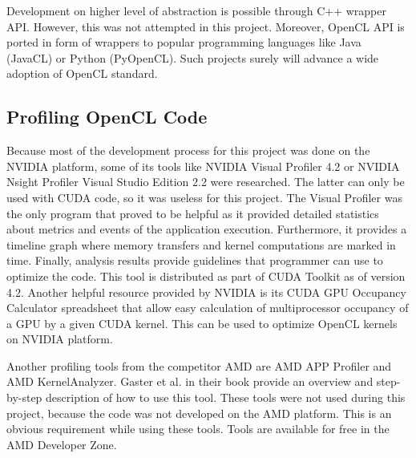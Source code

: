 Development on higher level of abstraction is possible through C++ wrapper API. However, this was not attempted in this project. Moreover, OpenCL API is ported in form of wrappers to popular programming languages like Java (JavaCL) or Python (PyOpenCL). Such projects surely will advance a wide adoption of OpenCL standard. 

\subsection{Profiling OpenCL Code}
Because most of the development process for this project was done on the NVIDIA platform, some of its tools like NVIDIA Visual Profiler 4.2 or NVIDIA Nsight Profiler Visual Studio Edition 2.2 were researched. The latter can only be used with CUDA code, so it was useless for this project. The Visual Profiler was the only program that proved to be helpful as it provided detailed statistics about metrics and events of the application execution. Furthermore, it provides a timeline graph where memory transfers and kernel computations are marked in time. Finally, analysis results provide guidelines that programmer can use to optimize the code. This tool is distributed as part of CUDA Toolkit as of version 4.2. 
Another helpful resource provided by NVIDIA is its CUDA GPU Occupancy Calculator spreadsheet that allow easy calculation of multiprocessor occupancy of a GPU by a given CUDA kernel. This can be used to optimize OpenCL kernels on NVIDIA platform.

Another profiling tools from the competitor AMD are AMD APP Profiler and AMD KernelAnalyzer. Gaster et al. in their book\cite{gaster2011heterogeneous} provide an overview and step-by-step description of how to use this tool. These tools were not used during this project, because the code was not developed on the AMD platform. This is an obvious requirement while using these tools. Tools are available for free in the AMD Developer Zone.



